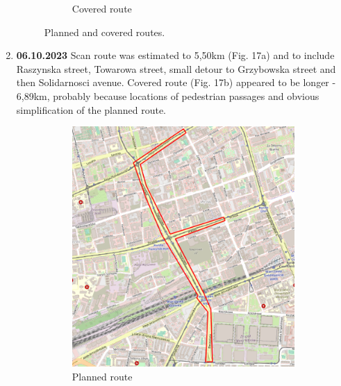 \documentclass[a4paper,12pt]{article}
\begin{document}
\begin{enumerate}
\begin{figure}[H]
\begin{subfigure}{.85\textwidth}
			\caption{Covered route}
			\label{fig:b15}
		\end{subfigure}
		\caption{Planned and covered routes.}
		\label{fig:fig15}
	\end{figure} 
	\pagebreak
	
	\item \textbf{06.10.2023} Scan route was estimated to 5,50km (Fig. 17a) and to include Raszynska street, Towarowa street, small detour to Grzybowska street and then Solidarnosci avenue. Covered route (Fig. 17b) appeared to be longer - 6,89km, probably because locations of pedestrian passages and obvious simplification of the planned route. 
	\begin{figure}[H]
		\centering
		\begin{subfigure}{.63\textwidth}
			\centering
			\includegraphics[width=1\linewidth]{route_p16}
			\caption{Planned route}
			\label{fig:a16}
		\end{subfigure}%
		\linebreak
		\begin{subfigure}{.63\textwidth}
			\centering

\end{subfigure}
\end{figure}
\end{enumerate}
\end{document}
